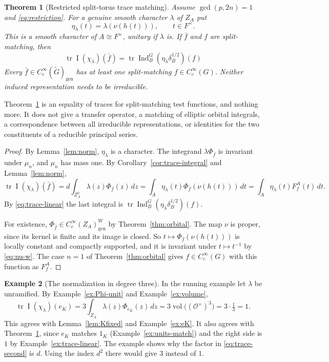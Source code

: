 \documentclass[12pt,letterpaper]{article}
\numberwithin{equation}{section}
\theoremstyle{plain}
\newtheorem{theorem}{Theorem}[section]
\theoremstyle{definition}
\newtheorem{example}[theorem]{Example}
\theoremstyle{remark}
\newcommand{\Gt}{\widetilde G}
\newcommand{\Of}{\mathcal O}
\newcommand{\ZA}{Z_A}
\newcommand{\gen}{\mathrm{gen}}
\DeclareMathOperator{\PI}{I}
\DeclareMathOperator{\Ind}{Ind}
\DeclareMathOperator{\tr}{tr}
\DeclareMathOperator{\vol}{vol}
\begin{document}
\begin{theorem}[Restricted split-torus trace matching]
\label{thm:transfer}
Assume $\gcd(p,2n)=1$ and \eqref{eq:restriction}. For a genuine smooth
character $\lambda$ of $\ZA$ put
\begin{equation}\label{eq:eta}
\eta_\lambda(t)=\lambda(\nu(h(t))),\qquad t\in F^\times .
\end{equation}
This is a smooth character of $A\cong F^\times$, unitary if $\lambda$
is. If $\bar f$ and $f$ are split-matching, then
\begin{equation}\label{eq:transfer-identity}
\boxed{\ \tr\PI(\chi_\lambda)(\bar f)=
\tr\Ind_B^G(\eta_\lambda\delta_B^{1/2})(f)\ }
\end{equation}
Every $\bar f\in C_c^\infty(\Gt)_\gen$ has at least one split-matching
$f\in C_c^\infty(G)$. Neither induced representation needs to be
irreducible.
\end{theorem}

Theorem~\ref{thm:transfer} is an equality of traces for split-matching
test functions, and nothing more. It does not give a transfer operator,
a matching of elliptic orbital integrals, a correspondence between all
irreducible representations, or identities for the two constituents of
a reducible principal series.

\begin{proof}
By Lemma~\ref{lem:norm}, $\eta_\lambda$ is a character. The integrand
$\lambda\Phi_{\bar f}$ is invariant under $\mu_n$, and $\mu_n$ has mass
one. By Corollary~\ref{cor:trace-integral} and Lemma~\ref{lem:norm},
\[
\tr\PI(\chi_\lambda)(\bar f)
=d\int_{\ZA^0}\lambda(z)\Phi_{\bar f}(z)\,dz
=\int_A\eta_\lambda(t)\Phi_{\bar f}(\nu(h(t)))\,dt
=\int_A\eta_\lambda(t)F_f^A(t)\,dt .
\]
By \eqref{eq:trace-linear} the last integral is
$\tr\Ind_B^G(\eta_\lambda\delta_B^{1/2})(f)$.

For existence, $\Phi_{\bar f}\in C_c^\infty(\ZA)_\gen^W$ by
Theorem~\ref{thm:orbital}. The map $\nu$ is proper, since its kernel is
finite and its image is closed. So $t\mapsto\Phi_{\bar f}(\nu(h(t)))$
is locally constant and compactly supported, and it is invariant under
$t\mapsto t^{-1}$ by \eqref{eq:nu-w}. The case $n=1$ of
Theorem~\ref{thm:orbital} gives $f\in C_c^\infty(G)$ with this
function as $F_f^A$.
\end{proof}

\begin{example}[The normalization in degree three]\label{ex:degree-three}
In the running example let $\lambda$ be unramified. By
Example~\ref{ex:Phi-unit} and Example~\ref{ex:volume},
\[
\tr\PI(\chi_\lambda)(e_K)=3\int_{\ZA}\lambda(z)\Phi_{e_K}(z)\,dz
=3\vol\bigl((\Of^\times)^3\bigr)=3\cdot\tfrac13=1 .
\]
This agrees with Lemma~\ref{lem:Kfixed} and Example~\ref{ex:eK}. It
also agrees with Theorem~\ref{thm:transfer}, since $e_K$ matches $1_K$
(Example~\ref{ex:units-match}) and the right side is $1$ by
Example~\ref{ex:trace-linear}. The example shows why the factor in
\eqref{eq:trace-second} is $d$. Using the index $d^2$ there would give
$3$ instead of $1$.
\end{example}
\end{document}
